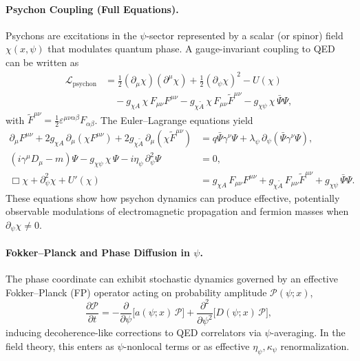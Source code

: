 \paragraph{Psychon Coupling (Full Equations).} Psychons are excitations in the $\psi$-sector represented by a scalar (or spinor) field $\chi(x,\psi)$ that modulates quantum phase. A gauge-invariant coupling to QED can be written as
\begin{align}
\mathcal{L}_{\mathrm{psychon}} &= \frac{1}{2} (\partial_\mu \chi)(\partial^\mu \chi)
+ \frac{1}{2} (\partial_\psi \chi)^2 - U(\chi) \nonumber\\
&\quad - g_{\chi A}\,\chi\, F_{\mu\nu}F^{\mu\nu}
- g_{\chi \tilde{A}}\,\chi\, F_{\mu\nu}\tilde{F}^{\mu\nu}
- g_{\chi \psi}\,\chi\, \bar{\Psi}\Psi ,
\end{align}
with $\tilde{F}^{\mu\nu}=\tfrac{1}{2}\varepsilon^{\mu\nu\alpha\beta}F_{\alpha\beta}$. The Euler--Lagrange equations yield
\begin{align}
\partial_\mu F^{\mu\nu} + 2 g_{\chi A}\,\partial_\mu(\chi F^{\mu\nu}) + 2 g_{\chi \tilde{A}}\,\partial_\mu(\chi \tilde{F}^{\mu\nu}) &= q \bar{\Psi}\gamma^\nu\Psi + \lambda_\psi\, \partial_\psi(\bar{\Psi}\gamma^\nu\Psi), \\
(i\gamma^\mu D_\mu - m)\Psi - g_{\chi \psi}\,\chi\, \Psi - i \eta_\psi\,\partial_\psi^2 \Psi &= 0, \\
\Box \chi + \partial_\psi^2 \chi + U'(\chi) &= g_{\chi A}\,F_{\mu\nu}F^{\mu\nu} + g_{\chi \tilde{A}}\,F_{\mu\nu}\tilde{F}^{\mu\nu} + g_{\chi \psi}\,\bar{\Psi}\Psi .
\end{align}
These equations show how psychon dynamics can produce effective, potentially observable modulations of electromagnetic propagation and fermion masses when $\partial_\psi \chi \neq 0$.

\paragraph{Fokker--Planck and Phase Diffusion in $\psi$.} The phase coordinate can exhibit stochastic dynamics governed by an effective Fokker--Planck (FP) operator acting on probability amplitude $\mathcal{P}(\psi;x)$,
\begin{equation}
\frac{\partial \mathcal{P}}{\partial t} = - \frac{\partial}{\partial \psi}\big[ a(\psi;x)\,\mathcal{P} \big]
+ \frac{\partial^2}{\partial \psi^2}\big[ D(\psi;x)\,\mathcal{P} \big] ,
\end{equation}
inducing decoherence-like corrections to QED correlators via $\psi$-averaging. In the field theory, this enters as $\psi$-nonlocal terms or as effective $\eta_\psi,\kappa_\psi$ renormalization.

